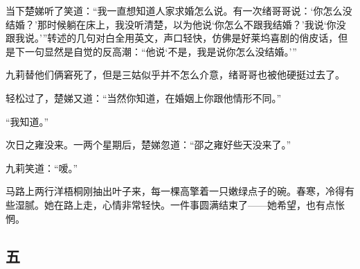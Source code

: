 \par 当下楚娣听了笑道：“我一直想知道人家求婚怎么说。有一次绪哥哥说：‘你怎么没结婚？’那时候躺在床上，我没听清楚，以为他说‘你怎么不跟我结婚？’我说‘你没跟我说。'”转述的几句对白全用英文，声口轻快，仿佛是好莱坞喜剧的俏皮话，但是下一句显然是自觉的反高潮：“他说‘不是，我是说你怎么没结婚。'”
\par 九莉替他们俩窘死了，但是三姑似乎并不怎么介意，绪哥哥也被他硬挺过去了。
\par 轻松过了，楚娣又道：“当然你知道，在婚姻上你跟他情形不同。”
\par “我知道。”
\par 次日之雍没来。一两个星期后，楚娣忽道：“邵之雍好些天没来了。”
\par 九莉笑道：“嗳。”
\par 马路上两行洋梧桐刚抽出叶子来，每一棵高擎着一只嫩绿点子的碗。春寒，冷得有些湿腻。她在路上走，心情非常轻快。一件事圆满结束了——她希望，也有点怅惘。



\subsection{五}

